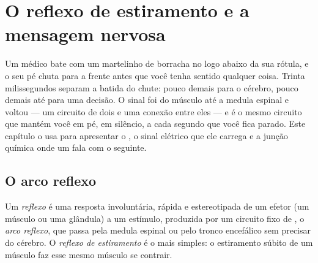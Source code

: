 \chapter{O reflexo de estiramento e a mensagem nervosa}\label{ch:g12:stretch-reflex}

Um médico bate com um martelinho de borracha no  logo abaixo da
sua rótula, e o seu pé chuta para a frente antes que você tenha sentido
qualquer coisa. Trinta milissegundos separam a batida do chute: pouco
demais para o cérebro, pouco demais até para uma decisão. O sinal foi
do músculo até a medula espinal e voltou --- um circuito de dois
 e uma conexão entre eles --- e é o mesmo circuito que mantém
você em pé, em silêncio, a cada segundo que você fica parado. Este
capítulo o usa para apresentar o , o sinal elétrico que ele
carrega e a junção química onde um  fala com o seguinte.

\section{O arco reflexo}

\begin{definition}[Reflexo]\label{def:g12:stretch-reflex:reflex}
Um \emph{reflexo} é uma resposta involuntária, rápida e
estereotipada de um efetor (um músculo ou uma glândula) a um estímulo,
produzida por um circuito fixo de , o \emph{arco
reflexo}, que passa pela medula espinal ou pelo
tronco encefálico sem precisar do cérebro. O \emph{reflexo de
estiramento} é o mais simples: o
estiramento súbito de um músculo faz esse mesmo músculo se contrair.
\end{definition}

